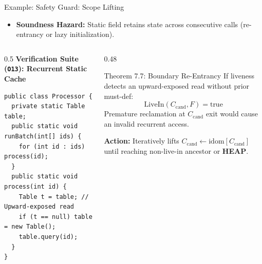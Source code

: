 \documentclass[11pt]{beamer}
\begin{document}
\begin{frame}[fragile]{Example: Safety Guard: Scope Lifting}
  \begin{itemize}
    \item \textbf{Soundness Hazard:} Static field retains state across consecutive calls (re-entrancy or lazy initialization).
  \end{itemize}

  \begin{columns}[T]
    \begin{column}{0.5\textwidth}
      {\scriptsize\bfseries\color{darkblue} Verification Suite (\texttt{O13}): Recurrent Static Cache}\\[2pt]
\begin{lstlisting}[style=javacodetiny]
public class Processor {
  private static Table table;
  public static void runBatch(int[] ids) {
    for (int id : ids) process(id);
  }
  public static void process(int id) {
    Table t = table; // Upward-exposed read
    if (t == null) table = new Table();
    table.query(id);
  }
}
\end{lstlisting}
    \end{column}
    \begin{column}{0.48\textwidth}
      \begin{alertblock}{Theorem 7.7: Boundary Re-Entrancy}
        \footnotesize
        If liveness detects an upward-exposed read without prior must-def:
        $$\text{LiveIn}(C_{\text{cand}}, F) = \text{true}$$
        Premature reclamation at $C_{\text{cand}}$ exit would cause an invalid recurrent access.
        \vspace{0.1em}
        
        \textbf{Action:} Iteratively lifts $C_{\text{cand}} \gets \text{idom}[C_{\text{cand}}]$ until reaching non-live-in ancestor or \textbf{HEAP}.
      \end{alertblock}
    \end{column}
  \end{columns}
\end{frame}
\end{document}
